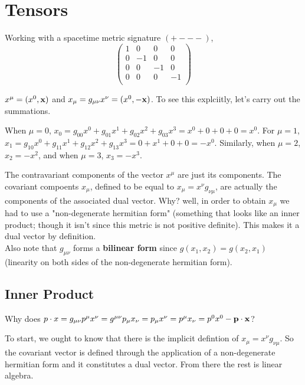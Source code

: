 \section{Tensors}

Working with a spacetime metric signature $(+ - - -)$,
$$
\begin{pmatrix}
    1 & 0  & 0  & 0  \\
    0 & -1 & 0  & 0  \\
    0 & 0  & -1 & 0  \\
    0 & 0  & 0  & -1 \\
\end{pmatrix}
$$

$x^\mu = (x^0, \boldsymbol{\mathbf{x}})$ and $x_\mu = g_{\mu\nu} x^\nu = (x^0, -\boldsymbol{\mathbf{x}})$.
To see this explciitly, let's carry out the summations.

When $\mu = 0$, $x_0 = g_{00}x^0 + g_{01}x^1 + g_{02}x^2 + g_{03}x^3 = x^0 + 0 + 0 +0 = x^0$.
For $\mu = 1$, $x_1 = g_{10}x^0 + g_{11}x^1 + g_{12}x^2 + g_{13}x^3 = 0 + x^1 + 0 +0 = -x^0$.
Similarly, when $\mu = 2$, $x_2 = -x^2$, and when $\mu =3$, $x_3 = -x^3$.

The contravariant components of the vector $x^\mu$ are just its components.
The covariant compoents $x_\mu$, defined to be equal to $x_\mu = x^\nu g_{\nu\mu}$, are actually the components
of the associated dual vector.
Why? well, in order to obtain $x_\mu$ we had to use a "non-degenerate hermitian form"
(something that looks like an inner product; though it isn't since this metric is not positive definite).
This makes it a dual vector by definition.
\\

Also note that $g_{\mu\nu}$ forms a \textbf{bilinear form} since $g(x_1, x_2) = g(x_2, x_1)$
(linearity on both sides of the non-degenerate hermitian form).


\subsection{Inner Product}

Why does $p \cdot x = g_{\mu\nu} p^\mu x^\nu = g^{\mu\nu} p_\mu x_\nu = p_\mu x^\nu = p^\mu x_\nu = p^0 x^0 - \boldsymbol{\mathbf{p}}\cdot\boldsymbol{\mathbf{x}}$?

To start, we ought to know that there is the implicit defintion of
$x_\mu = x^\nu g_{\nu\mu}$.
So the covariant vector is defined through the application of a non-degenerate hermitian form
and it constitutes a dual vector.
From there the rest is linear algebra.

